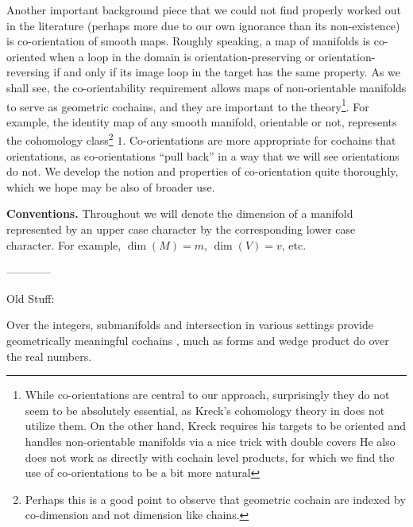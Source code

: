 Another important background piece that we could not find properly worked out in the literature (perhaps more due to our own ignorance than its non-existence) is co-orientation of smooth maps. Roughly speaking, a map of manifolds is co-oriented when a loop in the domain is orientation-preserving or orientation-reversing if and only if its image loop in the target has the same property. As we shall see, the co-orientability requirement allows maps of non-orientable manifolds to serve as geometric cochains, and they are important to the theory\footnote{While co-orientations are central to our approach, surprisingly they do not seem to be absolutely essential, as Kreck's cohomology theory in \cite{Krec10} does not utilize them. On the other hand, Kreck requires his targets to be oriented and handles non-orientable manifolds via a nice trick with double covers  He also does not work as directly with cochain level products, for which we find the use of co-orientations to be a bit more natural}. For example, the identity map of any smooth manifold, orientable or not, represents the cohomology class\footnote{Perhaps this is a good point to observe that geometric cochain are indexed by co-dimension and not dimension like chains.} $1$. Co-orientations are more appropriate for cochains that orientations, as co-orientations ``pull back'' in a way that we will see orientations do not. We develop the notion and properties of co-orientation quite thoroughly, which we hope may be also of broader use.








\textbf{Conventions.} Throughout we will denote the dimension of a manifold represented by an upper case character by the corresponding lower case character. For example, $\dim(M)=m$, $\dim(V)=v$, etc.



------------

Old Stuff:


Over the integers, submanifolds and intersection in various settings provide geometrically meaningful cochains \cite{Lipy14, Joyc15},
much as forms and wedge product do over the real numbers.

